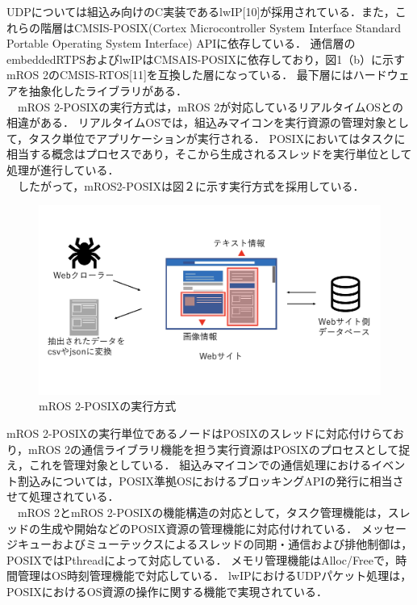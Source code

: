 \documentclass[11pt]{ujarticle}
\begin{document}
UDPについては組込み向けのC実装であるlwIP[10]が採用されている．また，これらの階層はCMSIS-POSIX(Cortex Microcontroller System Interface Standard Portable Operating System Interface) APIに依存している．
通信層のembeddedRTPSおよびlwIPはCMSAIS-POSIXに依存しており，図1（b）に示すmROS 2のCMSIS-RTOS[11]を互換した層になっている．
最下層にはハードウェアを抽象化したライブラリがある．
\\　mROS 2-POSIXの実行方式は，mROS 2が対応しているリアルタイムOSとの相違がある．
リアルタイムOSでは，組込みマイコンを実行資源の管理対象として，タスク単位でアプリケーションが実行される．
POSIXにおいてはタスクに相当する概念はプロセスであり，そこから生成されるスレッドを実行単位として処理が進行している．
\\　したがって，mROS2-POSIXは図２に示す実行方式を採用している．
\begin{figure}[h]
	\includegraphics[width=0.9\linewidth]{./src/selenium.png}
	\caption{mROS 2-POSIXの実行方式}
  \label{fig:arch}
\end{figure}
mROS 2-POSIXの実行単位であるノードはPOSIXのスレッドに対応付けらており，mROS 2の通信ライブラリ機能を担う実行資源はPOSIXのプロセスとして捉え，これを管理対象としている．
組込みマイコンでの通信処理におけるイベント割込みについては，POSIX準拠OSにおけるブロッキングAPIの発行に相当させて処理されている．
\\　mROS 2とmROS 2-POSIXの機能構造の対応として，タスク管理機能は，スレッドの生成や開始などのPOSIX資源の管理機能に対応付けれている．
メッセージキューおよびミューテックスによるスレッドの同期・通信および排他制御は，POSIXではPthreadによって対応している．
メモリ管理機能はAlloc/Freeで，時間管理はOS時刻管理機能で対応している．
lwIPにおけるUDPパケット処理は，POSIXにおけるOS資源の操作に関する機能で実現されている．
\end{document}
